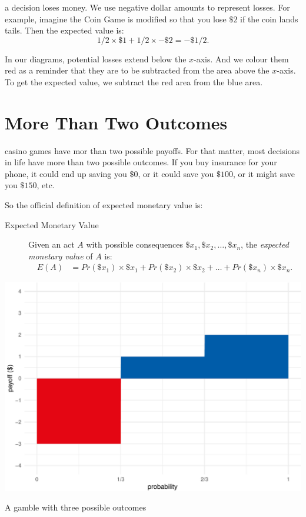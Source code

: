 \documentclass[justified]{tufte-book}
\newcommand{\p}{Pr}
\newcommand{\E}{E}
\theoremstyle{definition}
\theoremstyle{definition}
\theoremstyle{definition}
\theoremstyle{remark}
\begin{document}
 a decision loses money. We use negative dollar
amounts to represent losses. For example, imagine the Coin Game is
modified so that you lose \(\$2\) if the coin lands tails. Then the
expected value is: \[ 1/2 \times \$1 + 1/2 \times -\$2 = -\$1/2.\]

In our diagrams, potential losses extend below the \(x\)-axis. And we
colour them red as a reminder that they are to be subtracted from the
area above the \(x\)-axis. To get the expected value, we subtract the
red area from the blue area.

\hypertarget{more-than-two-outcomes}{%
\section{More Than Two Outcomes}\label{more-than-two-outcomes}}

 casino games have mor than two possible payoffs. For
that matter, most decisions in life have more than two possible
outcomes. If you buy insurance for your phone, it could end up saving
you \(\$0\), or it could save you \(\$100\), or it might save you
\(\$150\), etc.

So the official definition of expected monetary value is:

\begin{description}
\item[Expected Monetary Value]
Given an act \(A\) with possible consequences
\(\$x_1, \$x_2, \ldots, \$x_n\), the \emph{expected monetary value} of
\(A\) is: \[
  \begin{aligned}
\E(A) &= \p(\$x_1) \times \$x_1 + \p(\$x_2) \times \$x_2 + \ldots + \p(\$x_n) \times \$x_n.
  \end{aligned}
\]
\end{description}

\begin{marginfigure}
\includegraphics{_main_files/figure-latex/unnamed-chunk-92-1} \caption[A gamble with three possible outcomes]{A gamble with three possible outcomes}\label{fig:unnamed-chunk-92}
\end{marginfigure}
\end{document}
